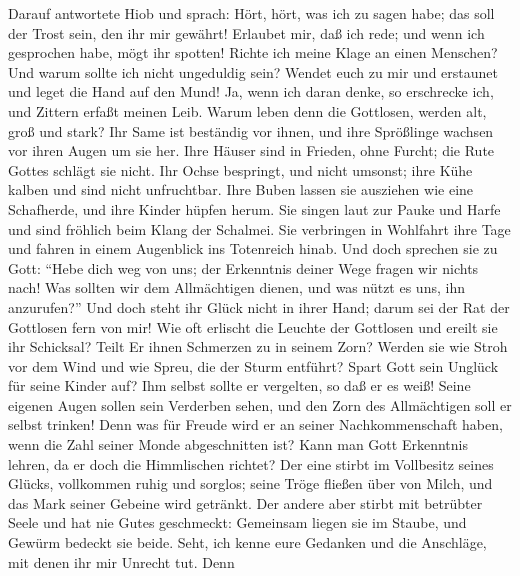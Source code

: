  Darauf antwortete Hiob und sprach:  Hört,
hört, was ich zu sagen habe; das soll der Trost sein, den ihr mir
gewährt!  Erlaubet mir, daß ich rede; und wenn ich
gesprochen habe, mögt ihr spotten!  Richte ich meine Klage
an einen Menschen? Und warum sollte ich nicht ungeduldig sein?
 Wendet euch zu mir und erstaunet und leget die Hand auf
den Mund!  Ja, wenn ich daran denke, so erschrecke ich,
und Zittern erfaßt meinen Leib.  Warum leben denn die
Gottlosen, werden alt, groß und stark?  Ihr Same ist
beständig vor ihnen, und ihre Sprößlinge wachsen vor ihren Augen um sie
her.  Ihre Häuser sind in Frieden, ohne Furcht; die Rute
Gottes schlägt sie nicht.  Ihr Ochse bespringt, und nicht
umsonst; ihre Kühe kalben und sind nicht unfruchtbar. 
Ihre Buben lassen sie ausziehen wie eine Schafherde, und ihre Kinder
hüpfen herum.  Sie singen laut zur Pauke und Harfe und
sind fröhlich beim Klang der Schalmei.  Sie verbringen in
Wohlfahrt ihre Tage und fahren in einem Augenblick ins Totenreich hinab.
 Und doch sprechen sie zu Gott: ``Hebe dich weg von uns;
der Erkenntnis deiner Wege fragen wir nichts nach!  Was
sollten wir dem Allmächtigen dienen, und was nützt es uns, ihn
anzurufen?''  Und doch steht ihr Glück nicht in ihrer
Hand; darum sei der Rat der Gottlosen fern von mir!  Wie
oft erlischt die Leuchte der Gottlosen und ereilt sie ihr Schicksal?
Teilt Er ihnen Schmerzen zu in seinem Zorn?  Werden sie
wie Stroh vor dem Wind und wie Spreu, die der Sturm entführt?
 Spart Gott sein Unglück für seine Kinder auf? Ihm selbst
sollte er vergelten, so daß er es weiß!  Seine eigenen
Augen sollen sein Verderben sehen, und den Zorn des Allmächtigen soll er
selbst trinken!  Denn was für Freude wird er an seiner
Nachkommenschaft haben, wenn die Zahl seiner Monde abgeschnitten ist?
 Kann man Gott Erkenntnis lehren, da er doch die
Himmlischen richtet?  Der eine stirbt im Vollbesitz
seines Glücks, vollkommen ruhig und sorglos;  seine Tröge
fließen über von Milch, und das Mark seiner Gebeine wird getränkt.
 Der andere aber stirbt mit betrübter Seele und hat nie
Gutes geschmeckt:  Gemeinsam liegen sie im Staube, und
Gewürm bedeckt sie beide.  Seht, ich kenne eure Gedanken
und die Anschläge, mit denen ihr mir Unrecht tut.  Denn
